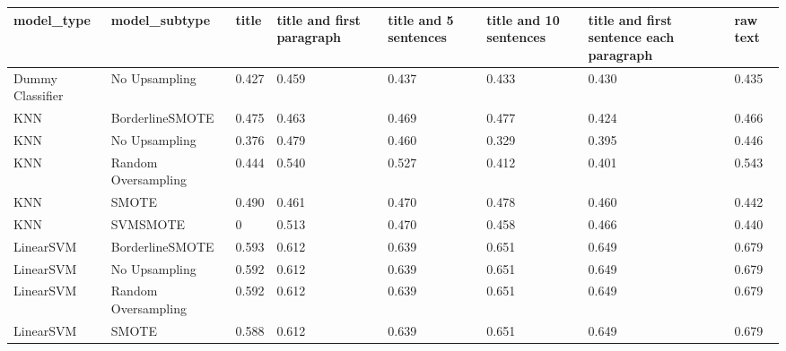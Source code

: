 \begin{tabular}{llllllll}
\toprule
                  model\_type &       model\_subtype & title & title and first paragraph & title and 5 sentences & title and 10 sentences & title and first sentence each paragraph &  raw text \\
\midrule
            Dummy Classifier &       No Upsampling & 0.427 &                     0.459 &                 0.437 &                  0.433 &                                   0.430 &     0.435 \\
                         KNN &     BorderlineSMOTE & 0.475 &                     0.463 &                 0.469 &                  0.477 &                                   0.424 &     0.466 \\
                         KNN &       No Upsampling & 0.376 &                     0.479 &                 0.460 &                  0.329 &                                   0.395 &     0.446 \\
                         KNN & Random Oversampling & 0.444 &                     0.540 &                 0.527 &                  0.412 &                                   0.401 &     0.543 \\
                         KNN &               SMOTE & 0.490 &                     0.461 &                 0.470 &                  0.478 &                                   0.460 &     0.442 \\
                         KNN &            SVMSMOTE &     0 &                     0.513 &                 0.470 &                  0.458 &                                   0.466 &     0.440 \\
                   LinearSVM &     BorderlineSMOTE & 0.593 &                     0.612 &                 0.639 &                  0.651 &                                   0.649 &     0.679 \\
                   LinearSVM &       No Upsampling & 0.592 &                     0.612 &                 0.639 &                  0.651 &                                   0.649 &     0.679 \\
                   LinearSVM & Random Oversampling & 0.592 &                     0.612 &                 0.639 &                  0.651 &                                   0.649 &     0.679 \\
                   LinearSVM &               SMOTE & 0.588 &                     0.612 &                 0.639 &                  0.651 &                                   0.649 &     0.679 \\

\end{tabular}
